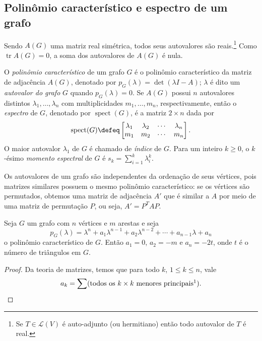 \documentclass{article}
\DeclareMathOperator{\tr}{tr}
\DeclareMathOperator{\spect}{spect}
\begin{document}
\subsection{Polinômio característico e espectro de um grafo}

Sendo \(A(G)\) uma matriz real simétrica, todos seus autovalores são reais.\footnote{Se \(T \in \mathcal{L}(V)\) é auto-adjunto (ou hermitiano) então todo autovalor de \(T\) é real.} Como \(\tr A(G) = 0\), a soma dos autovalores de \(A(G)\) é nula.

\begin{defn}
    O \emph{polinômio característico} de um grafo \(G\) é o polinômio característico da matriz de adjacência \(A(G)\), denotado por \(p_G(\lambda) = \det(\lambda I - A)\); \(\lambda\) é dito um \emph{autovalor do grafo} \(G\) quando \(p_G(\lambda) = 0\). Se \(A(G)\) possui \(n\) autovalores distintos \(\lambda_1, \ldots, \lambda_n\) com multiplicidades \(m_1, \ldots, m_n\), respectivamente, então o \emph{espectro} de \(G\), denotado por \(\spect(G)\), é a matriz \(2 \times n\) dada por
\[
    \spect(G) \defeq \begin{bmatrix}
        \lambda_1 & \lambda_2 & \cdots & \lambda_n \\
        m_1 & m_2 & \cdots & m_n
    \end{bmatrix}.
\]
O maior autovalor \(\lambda_1\) de \(G\) é chamado de \emph{índice} de \(G\). Para um inteiro \(k\geq0\), o \(k\)-ésimo \emph{momento espectral} de \(G\) é \(s_k = \sum_{i=1}^{k} \lambda_i^k\).
\end{defn}

Os autovalores de um grafo são independentes da ordenação de seus vértices, pois matrizes similares possuem o mesmo polinômio característico: se os vértices são permutados, obtemos uma matriz de adjacência \(A'\) que é similar a \(A\) por meio de uma matriz de permutação \(P\), ou seja, \(A' = P^T A P\).

\begin{prop}
    Seja \(G\) um grafo com \(n\) vértices e \(m\) arestas e seja
    \begin{equation}
        p_G(\lambda) = \lambda^n + a_1 \lambda^{n-1} + a_2 \lambda^{n-2} + \cdots + a_{n-1} \lambda + a_n
    \end{equation}
    o polinômio característico de \(G\). Então \(a_1 = 0\), \(a_2 = -m\) e \(a_n = -2t\), onde \(t\) é o número de triângulos em \(G\).
\end{prop}

\begin{proof}
    Da teoria de matrizes, temos que para todo \(k\), \(1 \leq k \leq n\), vale 
    \[
        a_k = \sum (\text{todos os \(k \times k\) menores principais}\footnotemark).
    \]
\end{proof}
\end{document}
